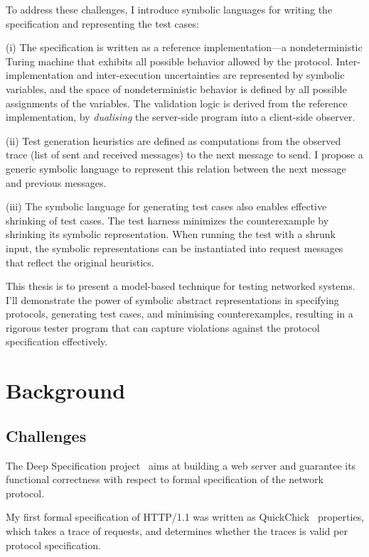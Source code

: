 \documentclass{article}
\newcommand{\http}{HTTP/1.1\xspace}
\theoremstyle{definition}
\begin{document}
To address these challenges, I introduce symbolic languages for writing the
specification and representing the test cases:

(i) The specification is written as a reference implementation---a
nondeterministic Turing machine that exhibits all possible behavior allowed by
the protocol.  Inter-implementation and inter-execution uncertainties are
represented by symbolic variables, and the space of nondeterministic behavior is
defined by all possible assignments of the variables.  The validation logic is
derived from the reference implementation, by {\em dualising} the server-side
program into a client-side observer.

(ii) Test generation heuristics are defined as computations from the observed
trace (list of sent and received messages) to the next message to send.  I
propose a generic symbolic language to represent this relation between the next
message and previous messages.

(iii) The symbolic language for generating test cases also enables effective
shrinking of test cases.  The test harness minimizes the counterexample by
shrinking its symbolic representation.  When running the test with a shrunk
input, the symbolic representations can be instantiated into request messages
that reflect the original heuristics.

This thesis is to present a model-based technique for testing networked systems.
I'll demonstrate the power of symbolic abstract representations in specifying protocols,
generating test cases, and minimising counterexamples, resulting in a rigorous
tester program that can capture violations against the protocol specification
effectively.

\section{Background}

\subsection{Challenges}
The Deep Specification project~\cite{deepspec} aims at building a web server and
guarantee its functional correctness with respect to formal specification of the
network protocol.

My first formal specification of \http was written as
QuickChick~\cite{quickchick} properties, which takes a trace of requests, and
determines whether the traces is valid per protocol specification.
\end{document}
